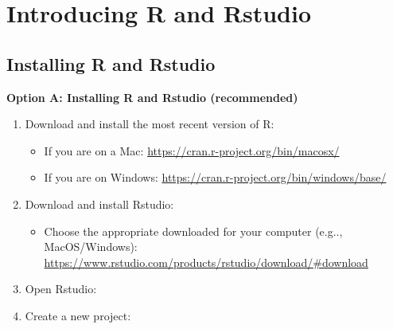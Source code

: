 \documentclass[]{book}
\providecommand{\tightlist}{%
  \setlength{\itemsep}{0pt}\setlength{\parskip}{0pt}}
\begin{document}
\hypertarget{introducing-r-and-rstudio}{%
\section{Introducing R and Rstudio}\label{introducing-r-and-rstudio}}

\hypertarget{installing-r-and-rstudio}{%
\subsection*{Installing R and Rstudio}\label{installing-r-and-rstudio}}

\textbf{Option A: Installing R and Rstudio (recommended)}

\begin{enumerate}
\def\labelenumi{\arabic{enumi}.}
\tightlist
\item
  Download and install the most recent version of R:

  \begin{itemize}
  \tightlist
  \item
    If you are on a Mac: \url{https://cran.r-project.org/bin/macosx/}
  \item
    If you are on Windows: \url{https://cran.r-project.org/bin/windows/base/}
  \end{itemize}
\item
  Download and install Rstudio:

  \begin{itemize}
  \tightlist
  \item
    Choose the appropriate downloaded for your computer (e.g.., MacOS/Windows): \url{https://www.rstudio.com/products/rstudio/download/\#download}
  \end{itemize}
\item
  Open Rstudio:
\item
  Create a new project:


\end{enumerate}
\end{document}
